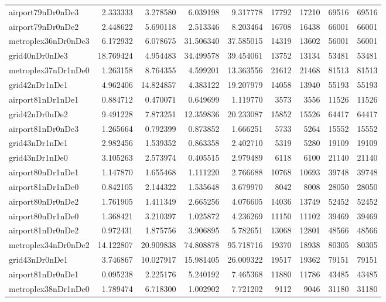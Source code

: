 \begin{longtable}{|l|r|r|r|r|r|r|r|r|}
airport79nDr0nDe3 & 2.333333 & 3.278580 & 6.039198 & 9.317778 & 17792 & 17210 & 69516 & 69516 \\
airport79nDr0nDe2 & 2.448622 & 5.690118 & 2.513346 & 8.203464 & 16708 & 16438 & 66001 & 66001 \\
metroplex36nDr0nDe3 & 6.172932 & 6.078675 & 31.506340 & 37.585015 & 14319 & 13602 & 56001 & 56001 \\
grid40nDr0nDe3 & 18.769424 & 4.954483 & 34.499578 & 39.454061 & 13752 & 13134 & 53481 & 53481 \\
metroplex37nDr1nDe0 & 1.263158 & 8.764355 & 4.599201 & 13.363556 & 21612 & 21468 & 81513 & 81513 \\
grid42nDr1nDe1 & 4.962406 & 14.824857 & 4.383122 & 19.207979 & 14058 & 13940 & 55193 & 55193 \\
airport81nDr1nDe1 & 0.884712 & 0.470071 & 0.649699 & 1.119770 & 3573 & 3556 & 11526 & 11526 \\
grid42nDr0nDe2 & 9.491228 & 7.873251 & 12.359836 & 20.233087 & 15852 & 15526 & 64417 & 64417 \\
airport81nDr0nDe3 & 1.265664 & 0.792399 & 0.873852 & 1.666251 & 5733 & 5264 & 15552 & 15552 \\
grid43nDr1nDe1 & 2.982456 & 1.539352 & 0.863358 & 2.402710 & 5319 & 5280 & 19109 & 19109 \\
grid43nDr1nDe0 & 3.105263 & 2.573974 & 0.405515 & 2.979489 & 6118 & 6100 & 21140 & 21140 \\
airport80nDr1nDe1 & 1.147870 & 1.655468 & 1.111220 & 2.766688 & 10768 & 10693 & 39748 & 39748 \\
airport81nDr1nDe0 & 0.842105 & 2.144322 & 1.535648 & 3.679970 & 8042 & 8008 & 28050 & 28050 \\
airport80nDr0nDe2 & 1.761905 & 1.411349 & 2.665256 & 4.076605 & 14036 & 13749 & 52452 & 52452 \\
airport80nDr1nDe0 & 1.368421 & 3.210397 & 1.025872 & 4.236269 & 11150 & 11102 & 39469 & 39469 \\
airport81nDr0nDe2 & 0.972431 & 1.875756 & 3.906895 & 5.782651 & 13068 & 12801 & 48566 & 48566 \\
metroplex34nDr0nDe2 & 14.122807 & 20.909838 & 74.808878 & 95.718716 & 19370 & 18938 & 80305 & 80305 \\
grid43nDr0nDe1 & 3.746867 & 10.027917 & 15.981405 & 26.009322 & 19517 & 19362 & 79151 & 79151 \\
airport81nDr0nDe1 & 0.095238 & 2.225176 & 5.240192 & 7.465368 & 11880 & 11786 & 43485 & 43485 \\
metroplex38nDr1nDe0 & 1.789474 & 6.718300 & 1.002902 & 7.721202 & 9112 & 9046 & 31180 & 31180 \\

\end{longtable}

